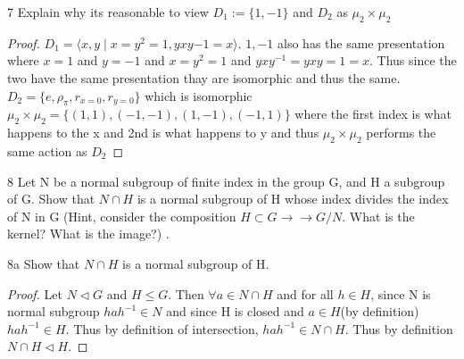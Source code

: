 \documentclass{article}
\newcommand{\angles}[1]{\langle{#1}\rangle}
\begin{document}
\bigskip

\begin{PROB}{7}\label{Problem 7.}
    Explain why its reasonable to view $D_1 := \{1,-1\}$ and $D_2$ as $\mu_2 \times \mu_2$
\end{PROB}
\begin{proof}
    $D_1 = \angles{x, y \mid x = y^2 = 1, yxy{-1} = x}$. ${1, -1}$ also has the same presentation where $x = 1$ and $y = -1$ and $x = y^2 = 1$ and $yxy^{-1} = yxy = 1 = x$. Thus since the two have the same presentation thay are isomorphic and thus the same. $D_2 = \{e, \rho_{\pi}, r_{x = 0}, r_{y=0}\}$ which is isomorphic $\mu_2 \times \mu_2 = \{(1, 1), (-1, -1), (1, -1), (-1, 1)\}$ where the first index is what happens to the x and 2nd is what happens to y and thus $\mu_2 \times \mu_2$ performs the same action as $D_2$
\end{proof}

\bigskip
\begin{PROB}{8}\label{Problem 8.}
    Let N be a normal subgroup of finite index in the group G, and H a subgroup of G. Show that $N \cap H$ is a normal subgroup of H whose index divides the index of N in G (Hint, consider the composition $H \subset G \to\to G/N$. What is the kernel? What is the image?) . 
\end{PROB}
\begin{claim}{8a}
    Show that $N \cap H$ is a normal subgroup of H.
\end{claim}
\begin{proof}
    Let $N \triangleleft G$ and $H \leq G$. Then $\forall a \in N \cap H$ and for all $h \in H$, since N is normal subgroup $hah^{-1} \in N$ and since H is closed and $a \in H$(by definition) $hah^{-1} \in H$. Thus by definition of intersection, $hah^{-1} \in N \cap H$. Thus by definition $N \cap H \triangleleft H$.
\end{proof}
\end{document}
